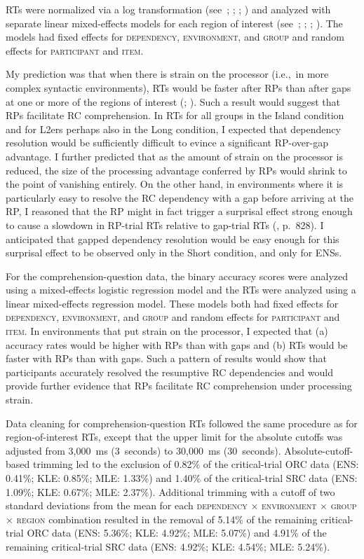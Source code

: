 RTs were normalized via a log transformation (see~\cite{hofmeister2011}; \cite{hofmeister.norcliffe2013}; \cite{mifka-profozic.etal2020}; \cite{santi.etal2019}) and analyzed with separate linear mixed-effects models for each region of interest (see~\cite{hofmeister2011}; \cite{hwang.schafer2009}; \cite{jackson2010}; \cite{keating.jegerski2015}). The models had fixed effects for \textsc{dependency}, \textsc{environment}, and \textsc{group} and random effects for \textsc{participant} and \textsc{item}.

My prediction was that when there is strain on the processor (i.e.,~in more complex syntactic environments), RTs would be faster after RPs than after gaps at one or more of the regions of interest (\cite{hammerly2022}; \cite{hofmeister.norcliffe2013}). Such a result would suggest that RPs facilitate RC comprehension. In RTs for all groups in the Island condition and for L2ers perhaps also in the Long condition, I expected that dependency resolution would be sufficiently difficult to evince a significant RP-over-gap advantage. I further predicted that as the amount of strain on the processor is reduced, the size of the processing advantage conferred by RPs would shrink to the point of vanishing entirely. On the other hand, in environments where it is particularly easy to resolve the RC dependency with a gap before arriving at the RP, I reasoned that the RP might in fact trigger a surprisal effect strong enough to cause a slowdown in RP-trial RTs relative to gap-trial RTs (\cite{hammerly2022}, p.~828). I anticipated that gapped dependency resolution would be easy enough for this surprisal effect to be observed only in the Short condition, and only for ENSs.

For the comprehension-question data, the binary accuracy scores were analyzed using a mixed-effects logistic regression model and the RTs were analyzed using a linear mixed-effects regression model. These models both had fixed effects for \textsc{dependency}, \textsc{environment}, and \textsc{group} and random effects for \textsc{participant} and \textsc{item}. In environments that put strain on the processor, I expected that (a) accuracy rates would be higher with RPs than with gaps and (b) RTs would be faster with RPs than with gaps. Such a pattern of results would show that participants accurately resolved the resumptive RC dependencies and would provide further evidence that RPs facilitate RC comprehension under processing strain.

Data cleaning for comprehension-question RTs followed the same procedure as for region-of-interest RTs, except that the upper limit for the absolute cutoffs was adjusted from 3,000~ms (3~seconds) to 30,000~ms (30~seconds). Absolute-cutoff-based trimming led to the exclusion of 0.82\% of the critical-trial ORC data (ENS: 0.41\%; KLE: 0.85\%; MLE: 1.33\%) and 1.40\% of the critical-trial SRC data (ENS: 1.09\%; KLE: 0.67\%; MLE: 2.37\%). Additional trimming with a cutoff of two standard deviations from the mean for each \textsc{dependency × environment × group × region} combination resulted in the removal of 5.14\% of the remaining critical-trial ORC data (ENS: 5.36\%; KLE: 4.92\%; MLE: 5.07\%) and 4.91\% of the remaining critical-trial SRC data (ENS: 4.92\%; KLE: 4.54\%; MLE: 5.24\%).

